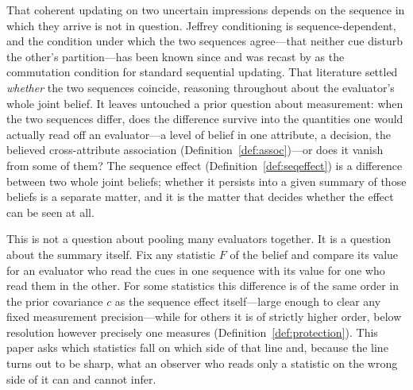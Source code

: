 %
%


That coherent updating on two uncertain impressions depends on the sequence in
which they arrive is not in question. Jeffrey conditioning is sequence-dependent,
and the condition under which the two sequences agree---that neither cue disturb
the other's partition---has been known since \citet{DiaconisZabell1982} and was
recast by \citet{HawthorneAND2004} as the commutation condition for standard
sequential updating. That literature settled \emph{whether} the two sequences
coincide, reasoning throughout about the evaluator's whole joint belief. It
leaves untouched a prior question about measurement: when the two sequences
differ, does the difference survive into the quantities one would actually read
off an evaluator---a level of belief in one attribute, a decision, the believed
cross-attribute association (Definition~\ref{def:assoc})---or does it vanish from
some of them? The sequence effect (Definition~\ref{def:seqeffect}) is a
difference between two whole joint beliefs; whether it persists into a given
summary of those beliefs is a separate matter, and it is the matter that decides
whether the effect can be seen at all.

This is not a question about pooling many evaluators together. It is a question
about the summary itself. Fix any statistic $F$ of the belief and compare its
value for an evaluator who read the cues in one sequence with its value for one
who read them in the other. For some statistics this difference is of the same
order in the prior covariance $c$ as the sequence effect itself---large enough
to clear any fixed measurement precision---while for others it is of strictly
higher order, below resolution however precisely one measures
(Definition~\ref{def:protection}). This paper asks which statistics fall on
which side of that line and, because the line turns out to be sharp, what an
observer who reads only a statistic on the wrong side of it can and cannot infer.

